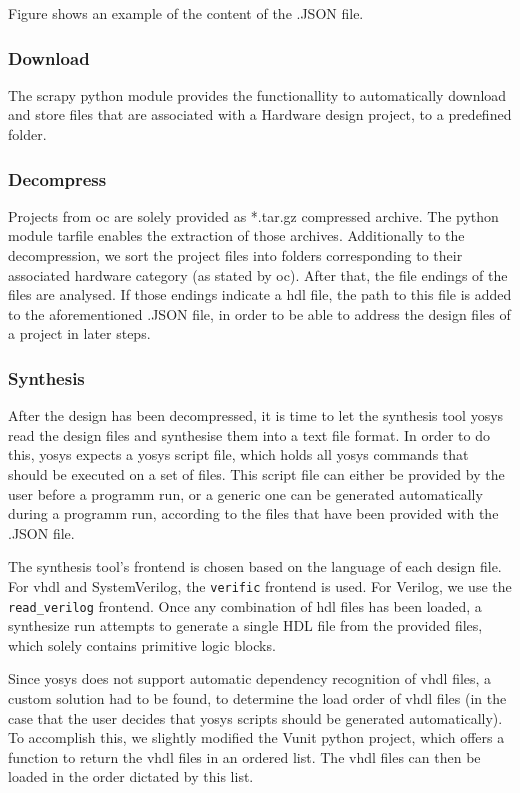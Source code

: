 Figure  shows an example of the content of the .JSON file. 

\subsubsection{Download}
The \Gls{scrapy} \Gls{python} module provides the functionallity to automatically download and
store files that are associated with a Hardware design project, to a predefined
folder.  

\subsubsection{Decompress} 
Projects from \gls{oc} are solely provided as *.tar.gz compressed archive. The \gls{python}
module tarfile enables the extraction of those archives. Additionally 
to the decompression, we sort the project files into folders corresponding to 
their associated hardware category (as stated by \gls{oc}). After that, the file 
endings of the files are analysed. If those endings indicate a \gls{hdl} file, the path 
to this file is added to the aforementioned .JSON file, in order to be able to
address the design files of a project in later steps.

\subsubsection{Synthesis} 
After the design has been decompressed, it is time to let the synthesis tool 
yosys read the design files and synthesise them into a text file format. In 
order to do this, yosys expects a yosys script file, which holds all yosys commands 
that should be executed on a set of files. This script file can either be provided
by the user before a programm run, or a generic one can be generated automatically 
during a programm run, according to the files that have been provided with the 
.JSON file. 

The synthesis tool's frontend is chosen based on the language of each design file.
For \gls{vhdl} and SystemVerilog, the \lstinline{verific} frontend is used. For Verilog,
we use the \lstinline{read_verilog} frontend. Once any combination of \gls{hdl} files
has been loaded, a synthesize run attempts to generate a single HDL file from the provided
files, which solely contains primitive logic blocks. 

Since yosys does not support automatic dependency recognition of vhdl files, a custom solution
had to be found, to determine the load order of vhdl files (in the case that the user decides
that yosys scripts should be generated automatically). To accomplish this, we slightly modified 
the Vunit python project, which offers a function to return the \gls{vhdl} 
files in an ordered list. The vhdl files can then be loaded in the order dictated by this list.  

